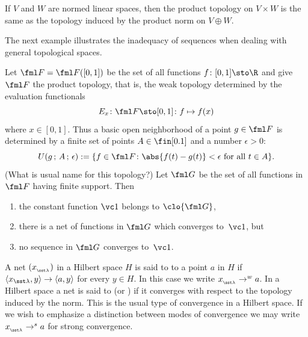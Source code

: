 \begin{exam}\label{exam_prod_top_norm} If $V$ and $W$ are normed linear spaces, then the product topology on
$V \times W$ is the same as the topology induced by the product norm on $V \oplus W$.
\end{exam}

The next example illustrates the inadequacy of sequences when dealing with general topological spaces.

\begin{exam} Let $\fml F = \fml F([0,1])$ be the set of all functions $f\colon [0,1] \sto \R$ and give
$\fml F$ the product topology, that is, the weak topology determined by the evaluation
functionals
    \[ E_x\colon \fml F \sto [0,1]\colon f \mapsto f(x) \]
where $x \in [0,1]$.  Thus a basic open neighborhood of a point $g \in \fml F$ is determined
by a finite set of points $A \in \fin[0.1]$ and a number $\epsilon > 0$:
  \[ U(g\,;\,A\,;\, \epsilon) := \{f \in \fml F\colon \abs{f(t) - g(t)} < \epsilon
                           \text{ for all $t \in A$}\}. \]
(What is usual name for this topology?) Let $\fml G$ be the set of all functions in $\fml F$
having finite support. Then
  \begin{enumerate}
    \item the constant function $\vc 1$ belongs to $\clo{\fml G}$,
    \item there is a net of functions in $\fml G$ which converges to~$\vc 1$, but
    \item no sequence in $\fml G$ converges to~$\vc 1$.
  \end{enumerate}
\end{exam}

\begin{defn} A net $(x_{{}_{\sst\lambda}})$ in a Hilbert space $H$ is said to
 to a point $a$ in $H$ if $\langle x{{}_{\sst\lambda}}, y \rangle \to \langle a,y \rangle$
for every $y \in H$. In this case we write $x_{{}_{\sst\lambda}} \to^w a$. In a Hilbert space a net is said to
 (or
) if it converges with respect to the topology induced by the norm. This is the usual type of
convergence in a Hilbert space. If we wish to emphasize a distinction between modes of convergence we may write
$x_{{}_{\sst\lambda}} \to^s a$ for strong convergence.
\end{defn}

